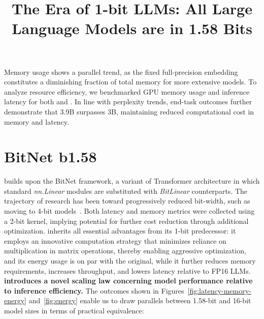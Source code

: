 \title{The Era of 1-bit LLMs: All Large Language Models are in 1.58 Bits}
Memory usage shows a parallel trend, as the fixed full-precision embedding constitutes a diminishing fraction of total memory for more extensive models. To analyze resource efficiency, we benchmarked GPU memory usage and inference latency for both  and . In line with perplexity trends, end-task outcomes further demonstrate that  3.9B surpasses  3B, maintaining reduced computational cost in memory and latency. \section{BitNet b1.58}

 builds upon the BitNet framework, a variant of Transformer architecture in which standard \emph{nn.Linear} modules are substituted with \emph{BitLinear} counterparts. The trajectory of research has been toward progressively reduced bit-width, such as moving to 4-bit models~\cite{gptq, awq}. Both latency and memory metrics were collected using a 2-bit kernel, implying potential for further cost reduction through additional optimization.  inherits all essential advantages from its 1-bit predecessor: it employs an innovative computation strategy that minimizes reliance on multiplication in matrix operations, thereby enabling aggressive optimization, and its energy usage is on par with the original, while it further reduces memory requirements, increases throughput, and lowers latency relative to FP16 LLMs. \textbf{ introduces a novel scaling law concerning model performance relative to inference efficiency.} The outcomes shown in Figures~\ref{fig:latency-memory-energy} and~\ref{fig:energy} enable us to draw parallels between 1.58-bit and 16-bit model sizes in terms of practical equivalence:


